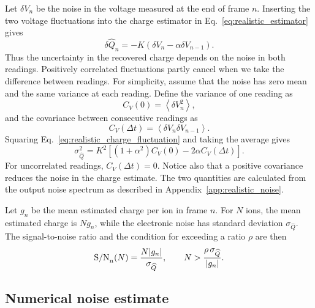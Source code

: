 Let $\delta V_n$ be the noise in the voltage measured at the end of frame $n$. Inserting the two voltage fluctuations into the charge estimator in Eq.~\eqref{eq:realistic_estimator} gives
\begin{equation}
 \delta\widehat Q_n=-K\left(\delta V_n-\alpha\delta V_{n-1}\right).
 \label{eq:realistic_charge_fluctuation}
\end{equation}
Thus the uncertainty in the recovered charge depends on the noise in both readings. Positively correlated fluctuations partly cancel when we take the difference between readings. For simplicity, assume that the noise has zero mean and the same variance at each reading. Define the variance of one reading as
\begin{equation}
 C_V(0)=\left\langle\delta V_n^2\right\rangle,
 \label{eq:realistic_sample_variance}
\end{equation}
and the covariance between consecutive readings as
\begin{equation}
 C_V(\Delta t)=\left\langle\delta V_n\delta V_{n-1}\right\rangle.
 \label{eq:realistic_sample_covariance}
\end{equation}
Squaring Eq.~\eqref{eq:realistic_charge_fluctuation} and taking the average gives
\begin{equation}
 \sigma_{\widehat Q}^{2}
 =K^2\left[(1+\alpha^2)C_V(0)-2\alpha C_V(\Delta t)\right].
 \label{eq:realistic_noise_charge}
\end{equation}
For uncorrelated readings, $C_V(\Delta t)=0$. Notice also that a positive covariance reduces the noise in the charge estimate. The two quantities are calculated from the output noise spectrum as described in Appendix~\ref{app:realistic_noise}.

Let $g_n$ be the mean estimated charge per ion in frame $n$. For $N$ ions, the mean estimated charge is $Ng_n$, while the electronic noise has standard deviation $\sigma_{\widehat Q}$. The signal-to-noise ratio and the condition for exceeding a ratio $\rho$ are then
\begin{equation}
 {\rm S/N}_n(N)=\frac{N|g_n|}{\sigma_{\widehat Q}},\qquad
 N>\frac{\rho\,\sigma_{\widehat Q}}{|g_n|}.
 \label{eq:realistic_sensitivity}
\end{equation}

\subsection{Numerical noise estimate}
\label{sec:numerical_noise}

